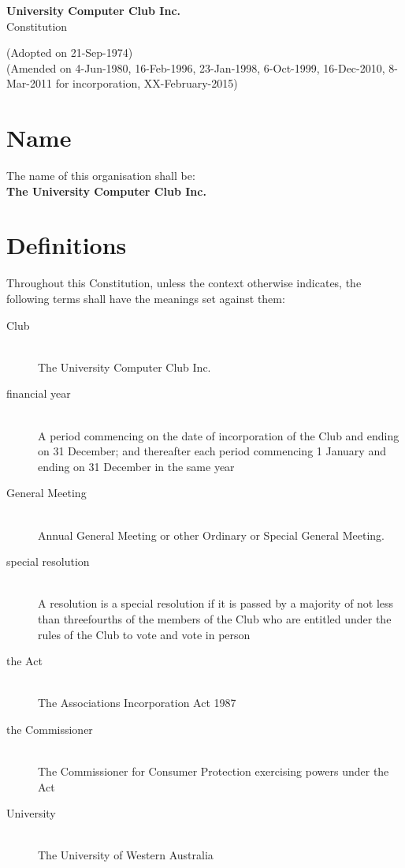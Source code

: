 \documentclass[11pt]{article} %
\makeatletter
\renewcommand\tableofcontents{%
    \@starttoc{toc}%
}
\makeatother
\begin{document}
\noindent
\begin{center}
\textbf{\LARGE{University Computer Club Inc.}}\\
\Large{Constitution}
\end{center}

\noindent
\small{(Adopted on 21-Sep-1974)\\
(Amended on 4-Jun-1980, 16-Feb-1996, 23-Jan-1998, 6-Oct-1999, 16-Dec-2010, 8-Mar-2011 for incorporation, XX-February-2015)\\}

\begingroup
	\let\cleardoublepage\clearpage
	\def\addvspace#1{}
	\tableofcontents
\endgroup


\section{Name}
\begin{description}
	\item The name of this organisation shall be: \hfill \\
		\large{\textbf{The University Computer Club Inc.}}
\end{description}

\section{Definitions}
Throughout this Constitution, unless the context otherwise indicates, the following terms shall have the meanings set against them:
\begin{description}
	\item[Club] \hfill \\
		The University Computer Club Inc.
	\item[financial year] \hfill \\
		A period commencing on the date of incorporation of the Club and ending on 31 December; and thereafter each period commencing 1 January and ending on 31 December in the same year
	\item[General Meeting] \hfill \\
		Annual General Meeting or other Ordinary or Special General Meeting.
	\item[special resolution] \hfill \\
		A resolution is a special resolution if it is passed by a majority of not less than threefourths of the members of the Club who are entitled under the rules of the Club to vote and vote in person
	\item[the Act] \hfill \\
		The Associations Incorporation Act 1987
	\item[the Commissioner] \hfill \\
		The Commissioner for Consumer Protection exercising powers under the Act
	\item[University] \hfill \\
		The University of Western Australia
\end{description}
\end{document}
